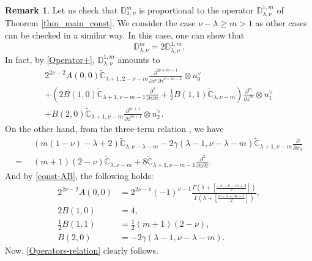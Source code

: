 \documentclass[12pt, pdflatex, a4paper]{article}
\theoremstyle{plain}
\theoremstyle{definition}
\newtheorem{rem}[thm]{Remark}
\def\C{{\mathbb C}}
\def\D{\mathbb{D}}
\begin{document}
\begin{rem}
Let us check that $\D_{\lambda, \nu}^m$ is proportional to the operator $\D_{\lambda, \nu}^{1, m}$ of Theorem \ref{thm_main_const}. We consider the case $\nu - \lambda \geq m > 1$ as other cases can be checked in a similar way. In this case, one can show that
\begin{equation}\label{Operators-relation}
\D_{\lambda, \nu}^m = 2\D_{\lambda, \nu}^{1,m}.
\end{equation}
In fact, by \eqref{Operator+}, $\D_{\lambda, \nu}^{1,m}$ amounts to
\begin{multline*}
2^{2\nu-2}A(0,0)\widetilde{\C}_{\lambda+1, 2-\nu-m}\frac{\partial^{2\nu+m-1}}{\partial z^\nu \partial \overline{z}^{\nu+m-1}} \otimes u_0^\vee\\
+\left(2B(1,0)\widetilde{\C}_{\lambda+1, \nu-m-1}\frac{\partial^2}{\partial z \partial \overline{z}} + \frac{1}{2}B(1,1)\widetilde{\C}_{\lambda, \nu-m}\right)\frac{\partial^m}{\partial \overline{z}^m}\otimes u_1^\vee\\
+B(2,0)\widetilde{\C}_{\lambda+1, \nu-m}\frac{\partial^{m+1}}{\partial \overline{z}^{m+1}} \otimes u_2^\vee.
\end{multline*}
On the other hand, from the three-term relation \cite[Eq. (9.5)]{Per-Val23}, we have
\begin{align*}
& (m(1-\nu)-\lambda+2)\widetilde{\C}_{\lambda, \nu-\lambda-m}
-2\gamma(\lambda-1, \nu-\lambda-m) \widetilde{\C}_{\lambda+1, \nu-m}\frac{\partial}{\partial x_3}\\
= \enspace & (m+1)(2-\nu)\widetilde{\C}_{\lambda, \nu-m} + 8\widetilde{\C}_{\lambda+1, \nu-m-1}\frac{\partial^2}{\partial z \partial \overline{z}}.
\end{align*}
And by \eqref{const-AB}, the following holds:
\begin{align*}
2^{2\nu-2}A(0,0) &= 2^{2\nu-1}(-1)^{\nu-1} \frac{\Gamma\left(\lambda + \left[\frac{-\lambda-\nu - m+2}{2}\right]\right)}{\Gamma(\lambda + \left[\frac{\nu - \lambda - m -1}{2}\right])},\\
2B(1,0) & = 4,\\
\frac{1}{2}B(1,1) & =\frac{1}{2}(m+1)(2-\nu),\\
B(2,0) &= -2\gamma(\lambda-1, \nu-\lambda-m).
\end{align*}
Now, \eqref{Operators-relation} clearly follows.
\end{rem}
\end{document}
